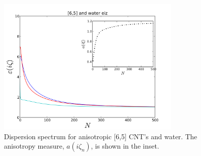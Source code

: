 \documentclass[a4paper]{article}
\begin{document}
\begin{center}
\begin{figure}[t!]
\begin{center}
\includegraphics[width=0.8\textwidth]{prop_plots/65w65_eiz.png}
\hskip 43pt
\caption{Dispersion spectrum for anisotropic [6,5] CNT's and
water. The anisotropy measure, $a(i\zeta_n)$, is shown in the inset.} 
\label{eiz65}
\end{center}
\end{figure} 

\end{center}
\end{document}
